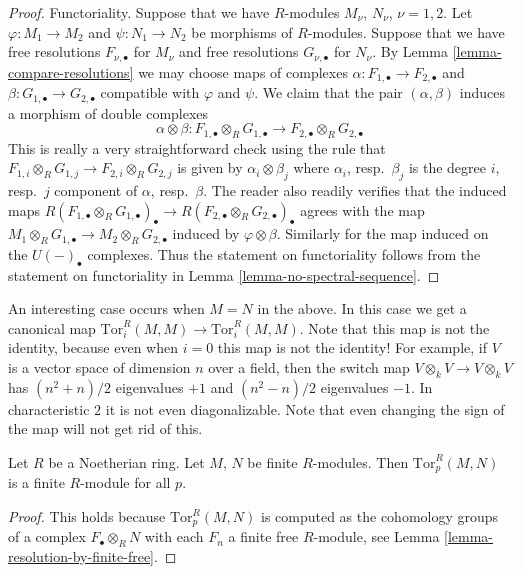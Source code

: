 \begin{proof}
\medskip\noindent
Functoriality. Suppose that we have $R$-modules $M_\nu$, $N_\nu$,
$\nu = 1, 2$. Let $\varphi : M_1 \to M_2$ and $\psi : N_1 \to N_2$
be morphisms of $R$-modules.
Suppose that we have free resolutions $F_{\nu, \bullet}$
for $M_\nu$ and free resolutions $G_{\nu, \bullet}$ for $N_\nu$.
By Lemma \ref{lemma-compare-resolutions} we may choose
maps of complexes $\alpha : F_{1, \bullet} \to F_{2, \bullet}$
and $\beta : G_{1, \bullet} \to G_{2, \bullet}$ compatible
with $\varphi$ and $\psi$. We claim that
the pair $(\alpha, \beta)$ induces a morphism of double
complexes
$$
\alpha \otimes \beta :
F_{1, \bullet} \otimes_R G_{1, \bullet}
\longrightarrow
F_{2, \bullet} \otimes_R G_{2, \bullet}
$$
This is really a very straightforward check using the rule
that $F_{1, i} \otimes_R G_{1, j} \to F_{2, i} \otimes_R G_{2, j}$
is given by $\alpha_i \otimes \beta_j$ where $\alpha_i$,
resp.\ $\beta_j$ is the degree $i$, resp.\ $j$ component of $\alpha$,
resp.\ $\beta$. The reader also readily verifies that the
induced maps $R(F_{1, \bullet} \otimes_R G_{1, \bullet})_\bullet
\to R(F_{2, \bullet} \otimes_R G_{2, \bullet})_\bullet$
agrees with the map $M_1 \otimes_R G_{1, \bullet}
\to M_2 \otimes_R G_{2, \bullet}$ induced by $\varphi \otimes \beta$.
Similarly for the map induced on the $U(-)_\bullet$ complexes.
Thus the statement on functoriality follows from the statement
on functoriality in Lemma \ref{lemma-no-spectral-sequence}.
\end{proof}

\begin{remark}
\label{remark-curiosity-signs-swap}
An interesting case occurs when $M = N$ in the above.
In this case we get a canonical map $\text{Tor}_i^R(M, M)
\to \text{Tor}_i^R(M, M)$. Note that this map is not the
identity, because even when $i = 0$ this map is not the
identity! For example, if $V$ is a vector space of dimension
$n$ over a field, then the switch map $V \otimes_k V \to V \otimes_k V$
has $(n^2 + n)/2$ eigenvalues $+1$ and $(n^2-n)/2$ eigenvalues
$-1$. In characteristic $2$ it is not even diagonalizable.
Note that even changing the sign of the map will not get rid
of this.
\end{remark}

\begin{lemma}
\label{lemma-tor-noetherian}
Let $R$ be a Noetherian ring. Let $M$, $N$ be finite $R$-modules.
Then $\text{Tor}_p^R(M, N)$ is a finite $R$-module for all $p$.
\end{lemma}

\begin{proof}
This holds because $\text{Tor}_p^R(M, N)$ is computed as the
cohomology groups of a complex $F_\bullet \otimes_R N$
with each $F_n$ a finite free $R$-module, see
Lemma \ref{lemma-resolution-by-finite-free}.
\end{proof}

